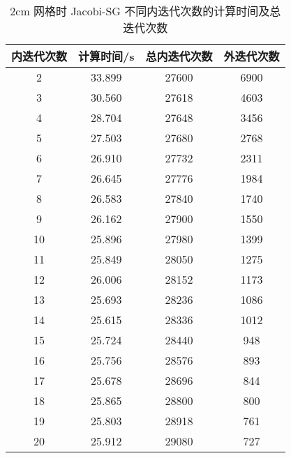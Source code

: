 \begin{datasheet}
\begin{table}
\centering
\caption{2cm 网格时 Jacobi-SG 不同内迭代次数的计算时间及总迭代次数}
\label{tab:equsolve.iter.jacobi-sg.2cm}
\begin{tabular}{cccc}
\toprule
内迭代次数 & 计算时间/s & 总内迭代次数 & 外迭代次数\\
\midrule
2 & 33.899 & 27600 & 6900\\
3 & 30.560 & 27618 & 4603\\
4 & 28.704 & 27648 & 3456\\
5 & 27.503 & 27680 & 2768\\
6 & 26.910 & 27732 & 2311\\
7 & 26.645 & 27776 & 1984\\
8 & 26.583 & 27840 & 1740\\
9 & 26.162 & 27900 & 1550\\
10 & 25.896 & 27980 & 1399\\
11 & 25.849 & 28050 & 1275\\
12 & 26.006 & 28152 & 1173\\
13 & 25.693 & 28236 & 1086\\
14 & 25.615 & 28336 & 1012\\
15 & 25.724 & 28440 & 948\\
16 & 25.756 & 28576 & 893\\
17 & 25.678 & 28696 & 844\\
18 & 25.865 & 28800 & 800\\
19 & 25.803 & 28918 & 761\\
20 & 25.912 & 29080 & 727\\
\bottomrule
\end{tabular}
\end{table}



\end{datasheet}

